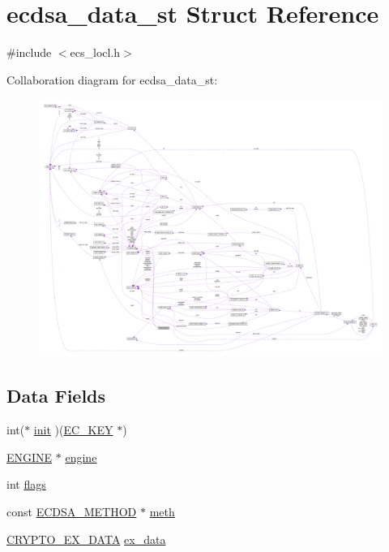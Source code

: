 \hypertarget{structecdsa__data__st}{}\section{ecdsa\+\_\+data\+\_\+st Struct Reference}
\label{structecdsa__data__st}


{\ttfamily \#include $<$ecs\+\_\+locl.\+h$>$}



Collaboration diagram for ecdsa\+\_\+data\+\_\+st\+:\nopagebreak
\begin{figure}[H]
\begin{center}
\leavevmode
\includegraphics[width=350pt]{structecdsa__data__st__coll__graph}
\end{center}
\end{figure}
\subsection*{Data Fields}
\begin{DoxyCompactItemize}
\item 
int($\ast$ \hyperlink{structecdsa__data__st_abe4cc01385a304b13c23583b069cba3f}{init} )(\hyperlink{crypto_2ec_2ec_8h_a756878ae60b2fc17d4217e77ffe5e0d3}{E\+C\+\_\+\+K\+EY} $\ast$)
\item 
\hyperlink{crypto_2ossl__typ_8h_abac45b251498719318e60ab8d6192510}{E\+N\+G\+I\+NE} $\ast$ \hyperlink{structecdsa__data__st_a4eb35fa252ec72ad7c53a4c8d30a7fd3}{engine}
\item 
int \hyperlink{structecdsa__data__st_ac8bf36fe0577cba66bccda3a6f7e80a4}{flags}
\item 
const \hyperlink{crypto_2ossl__typ_8h_a9372d671f0f832e3c51b8e308c9ad1aa}{E\+C\+D\+S\+A\+\_\+\+M\+E\+T\+H\+OD} $\ast$ \hyperlink{structecdsa__data__st_adc7145943aac04edd39dc56750230a7e}{meth}
\item 
\hyperlink{crypto_2ossl__typ_8h_a7eaff1c18057495d8af18f22d1370b51}{C\+R\+Y\+P\+T\+O\+\_\+\+E\+X\+\_\+\+D\+A\+TA} \hyperlink{structecdsa__data__st_ac3e4fd59d6ee44a81f3a58114613c1e2}{ex\+\_\+data}
\end{DoxyCompactItemize}


